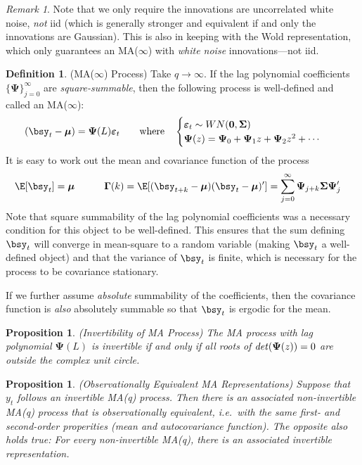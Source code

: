 \documentclass[12pt]{article}
\theoremstyle{plain}
\newtheorem{prop}[thm]{Proposition}
\theoremstyle{definition}
\newtheorem{defn}[thm]{Definition}
\theoremstyle{remark}
\newtheorem*{rmk}{Remark}
\newcommand{\ra}{\rightarrow}
\newcommand{\bsmu}{\boldsymbol{\mu}}
\newcommand{\bsSigma}{\boldsymbol{\Sigma}}
\newcommand{\bsvarepsilon}{\boldsymbol{\varepsilon}}
\newcommand{\bsGamma}{\boldsymbol{\Gamma}}
\newcommand{\bsPsi}{\boldsymbol{\Psi}}
\renewcommand{\bso}{\boldsymbol{0}}
\begin{document}
\begin{rmk}
Note that we only require the innovations are uncorrelated white noise,
\emph{not} iid (which is generally stronger and equivalent if and only
the innovations are Gaussian).
This is also in keeping with the Wold representation, which only
guarantees an MA($\infty$) with \emph{white noise} innovations---not
iid.
\end{rmk}

\begin{defn}(MA($\infty$) Process)
Take $q\ra \infty$. If the lag polynomial coefficients
$\{\bsPsi\}_{j=0}^\infty$ are \emph{square-summable}, then the following
process is well-defined and called an MA($\infty$):
\begin{align*}
  (\bsy_t - \bsmu) &= \bsPsi(L)\bsvarepsilon_t
  \qquad
  \text{where}\quad
  \begin{cases}
    \bsvarepsilon_t \sim WN(\bso,\bsSigma) \\
    \bsPsi(z) = \bsPsi_0 + \bsPsi_1z + \bsPsi_2z^2 + \cdots
  \end{cases}
\end{align*}
It is easy to work out the mean and covariance function of the process
\begin{align*}
  \E[\bsy_t]
  =\bsmu
  \qquad
  \quad
  \bsGamma(k)
  =
  \E[(\bsy_{t+k}-\bsmu)(\bsy_t-\bsmu)']
  &= \sum_{j=0}^{\infty} \bsPsi_{j+k}\bsSigma\bsPsi_j'
\end{align*}
Note that square summability of the lag polynomial coefficients was a
necessary condition for this object to be well-defined.
This ensures that the sum defining $\bsy_t$ will converge in mean-square
to a random variable (making $\bsy_t$ a well-defined object) and that
the variance of $\bsy_t$ is finite, which is necessary for the process
to be covariance stationary.

If we further assume \emph{absolute} summability of the coefficients,
then the covariance function is \emph{also} absolutely summable so that
$\bsy_t$ is ergodic for the mean.
\end{defn}

\begin{prop}\emph{(Invertibility of MA Process)}
The MA process with lag polynomial $\bsPsi(L)$ is invertible if and only
if all roots of $\text{\emph{det}}(\bsPsi(z))=0$ are outside the complex
unit circle.
\end{prop}

\begin{prop}\emph{(Observationally Equivalent MA Representations)}
Suppose that $y_t$ follows an invertible MA(q) process. Then there is an
associated non-invertible MA(q) process that is
\emph{observationally equivalent}, i.e.\ with the same first- and
second-order properities (mean and autocovariance function). The
opposite also holds true: For every non-invertible MA(q), there is an
associated invertible representation.
\end{prop}
\end{document}
